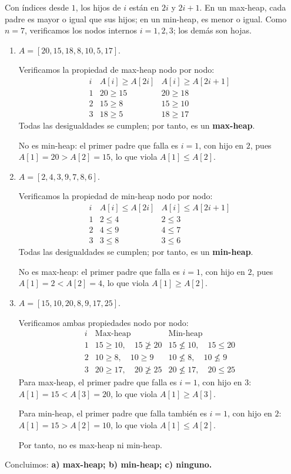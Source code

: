 Con índices desde $1$, los hijos de $i$ están en $2i$ y $2i+1$. En un max-heap, cada padre es mayor o igual que sus hijos; en un min-heap, es menor o igual. Como $n=7$, verificamos los nodos internos $i=1,2,3$; los demás son hojas.

\begin{enumerate}
\item[a)] $A=[20,15,18,8,10,5,17]$.

Verificamos la propiedad de max-heap nodo por nodo:
\[
\begin{array}{c|c|c}
i & A[i]\ge A[2i] & A[i]\ge A[2i+1]\\ \hline
1 & 20\ge15 & 20\ge18\\
2 & 15\ge8  & 15\ge10\\
3 & 18\ge5  & 18\ge17
\end{array}
\]
Todas las desigualdades se cumplen; por tanto, es un \textbf{max-heap}.

No es min-heap: el primer padre que falla es $i=1$, con hijo en $2$, pues $A[1]=20>A[2]=15$, lo que viola $A[1]\le A[2]$.

\item[b)] $A=[2,4,3,9,7,8,6]$.

Verificamos la propiedad de min-heap nodo por nodo:
\[
\begin{array}{c|c|c}
i & A[i]\le A[2i] & A[i]\le A[2i+1]\\ \hline
1 & 2\le4 & 2\le3\\
2 & 4\le9 & 4\le7\\
3 & 3\le8 & 3\le6
\end{array}
\]
Todas las desigualdades se cumplen; por tanto, es un \textbf{min-heap}.

No es max-heap: el primer padre que falla es $i=1$, con hijo en $2$, pues $A[1]=2<A[2]=4$, lo que viola $A[1]\ge A[2]$.

\item[c)] $A=[15,10,20,8,9,17,25]$.

Verificamos ambas propiedades nodo por nodo:
\[
\begin{array}{c|c|c}
i & \text{Max-heap} & \text{Min-heap}\\ \hline
1 & 15\ge10,\quad 15\not\ge20 & 15\not\le10,\quad 15\le20\\
2 & 10\ge8,\quad 10\ge9 & 10\not\le8,\quad 10\not\le9\\
3 & 20\ge17,\quad 20\not\ge25 & 20\not\le17,\quad 20\le25
\end{array}
\]
Para max-heap, el primer padre que falla es $i=1$, con hijo en $3$: $A[1]=15<A[3]=20$, lo que viola $A[1]\ge A[3]$.

Para min-heap, el primer padre que falla también es $i=1$, con hijo en $2$: $A[1]=15>A[2]=10$, lo que viola $A[1]\le A[2]$.

Por tanto, no es max-heap ni min-heap.
\end{enumerate}

Concluimos: \textbf{a) max-heap; b) min-heap; c) ninguno.}
\fin
